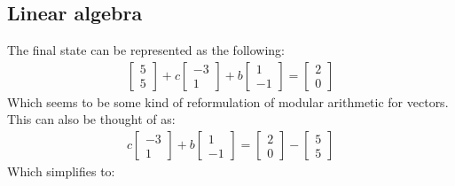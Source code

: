 \documentclass[letterpaper, 12pt]{article}
\begin{document}
\subsection{Linear algebra}
The final state can be represented as the following:
\begin{align*}
\begin{bmatrix}
    5\\
    5
\end{bmatrix}
+ c
\begin{bmatrix}
    -3\\
    1
\end{bmatrix}
+ b
\begin{bmatrix}
    1\\
    -1
\end{bmatrix}
 =
\begin{bmatrix}
    2\\
    0
\end{bmatrix}
\end{align*}
Which seems to be some kind of reformulation of modular arithmetic for vectors.
This can also be thought of as:
\begin{align*}
c
\begin{bmatrix}
    -3\\
    1
\end{bmatrix}
+ b
\begin{bmatrix}
    1\\
    -1
\end{bmatrix}
=
\begin{bmatrix}
    2\\
    0
\end{bmatrix}
 -
\begin{bmatrix}
    5\\
    5
\end{bmatrix}
\end{align*}
Which simplifies to:
\end{document}
